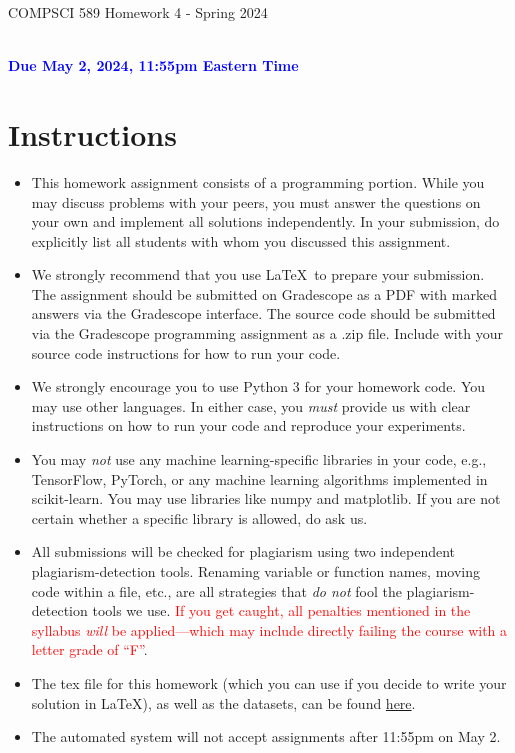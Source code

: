 \documentclass[letterpaper]{article}
\newcommand{\HIGHLIGHT}[1]{\textcolor{blue}{\textbf{#1}}}
\begin{document}
\newpage
\begin{center}
    \begin{Large}
    COMPSCI 589 Homework 4 - Spring 2024
    \end{Large}
    \\
    \HIGHLIGHT{Due May 2, 2024, 11:55pm Eastern Time}
\end{center}



\vspace{0.25in}
\section{Instructions}

\begin{itemize}
    \item This homework assignment consists of a programming portion. While you may discuss problems with your peers, you must answer the questions on your own and implement all solutions independently. In your submission, do explicitly list all students with whom you discussed this assignment. 
    \item We strongly recommend that you use \LaTeX~to prepare your submission. The assignment should be submitted on Gradescope as a PDF with marked answers via the Gradescope interface. The source code should be submitted via the Gradescope programming assignment as a .zip file. Include with your source code instructions for how to run your code. 
    \item We strongly encourage you to use Python 3 for your homework code. You may use other languages. In either case, you \textit{must} provide us with clear instructions on how to run your code and reproduce your experiments. 
    \item You may \textit{not} use any machine learning-specific libraries in your code, e.g., TensorFlow, PyTorch, or any machine learning algorithms implemented in scikit-learn. You may use libraries like numpy and matplotlib. If you are not certain whether a specific library is allowed, do ask us.
    \item All submissions will be checked for plagiarism using two independent plagiarism-detection tools. Renaming variable or function names, moving code within a file, etc., are all strategies that \textit{do not} fool the plagiarism-detection tools we use. \textcolor{red}{If you get caught, all penalties mentioned in the syllabus \textit{will} be applied---which may include directly failing the course with a letter grade of ``F''}.
    \item The tex file for this homework (which you can use if you decide to write your solution in \LaTeX), as well as the datasets, can be found \href{https://people.cs.umass.edu/~bsilva/courses/CMPSCI_589/Spring2024/homeworks/hw4.zip}{here}.
    \item The automated system will not accept assignments after 11:55pm on May 2. 
\end{itemize}
\end{document}
